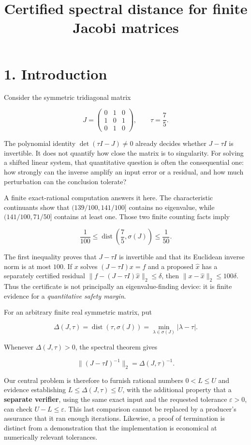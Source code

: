 \documentclass[
  11pt,
]{article}
\title{Certified spectral distance for finite Jacobi matrices}
\author{}
\date{}
\begin{document}
\maketitle

\section{1. Introduction}\label{introduction}

Consider the symmetric tridiagonal matrix

\[
J=\begin{pmatrix}0&1&0\\1&0&1\\0&1&0\end{pmatrix},
\qquad \tau=\frac75.
\]

The polynomial identity \(\det(\tau I-J)\ne0\) already decides whether
\(J-\tau I\) is invertible. It does not quantify how close the matrix is
to singularity. For solving a shifted linear system, that quantitative
question is often the consequential one: how strongly can the inverse
amplify an input error or a residual, and how much perturbation can the
conclusion tolerate?

A finite exact-rational computation answers it here. The characteristic
continuants show that \((139/100,141/100]\) contains no eigenvalue,
while \((141/100,71/50]\) contains at least one. Those two finite
counting facts imply

\[
\boxed{\frac1{100}\le
\operatorname{dist}\!\left(\frac75,\sigma(J)\right)
\le\frac1{50}.}
\tag{1.1}
\]

The first inequality proves that \(J-\tau I\) is invertible and that its
Euclidean inverse norm is at most \(100\). If \(x\) solves
\((J-\tau I)x=f\) and a proposed \(\widehat x\) has a separately
certified residual \(\|f-(J-\tau I)\widehat x\|_2\le\delta\), then
\(\|x-\widehat x\|_2\le100\delta\). Thus the certificate is not
principally an eigenvalue-finding device: it is finite evidence for a
\emph{quantitative safety margin}.

For an arbitrary finite real symmetric matrix, put

\[
\Delta(J,\tau)=\operatorname{dist}(\tau,\sigma(J))
=\min_{\lambda\in\sigma(J)}|\lambda-\tau|.
\tag{1.2}
\]

Whenever \(\Delta(J,\tau)>0\), the spectral theorem gives

\[
\|(J-\tau I)^{-1}\|_2=\Delta(J,\tau)^{-1}.
\tag{1.3}
\]

Our central problem is therefore to furnish rational numbers
\(0<L\le U\) and evidence establishing \(L\le\Delta(J,\tau)\le U\), with
the additional property that a \textbf{separate verifier}, using the
same exact input and the requested tolerance \(\varepsilon>0\), can
check \(U-L\le\varepsilon\). This last comparison cannot be replaced by
a producer's assurance that it ran enough iterations. Likewise, a proof
of termination is distinct from a demonstration that the implementation
is economical at numerically relevant tolerances.
\end{document}
